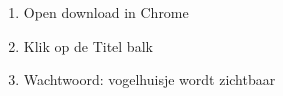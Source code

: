 \begin{enumerate}
  \item Open download in Chrome
  \item Klik op de Titel balk
  \item Wachtwoord: vogelhuisje wordt zichtbaar
\end{enumerate}